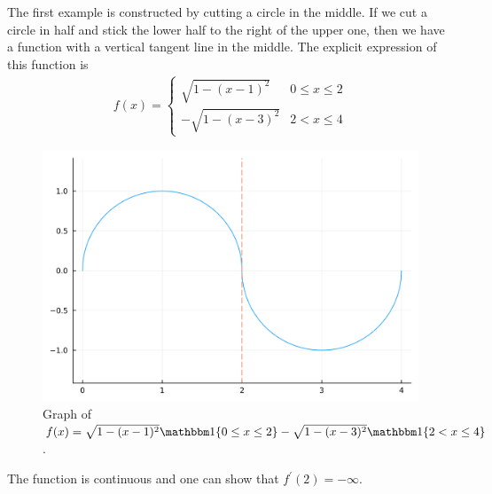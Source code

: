 \documentclass[thmcnt=section, 12pt]{my-elegantbook}
\begin{document}
\begin{example}
    The first example is constructed by cutting a circle in the middle. If we cut a circle in half and stick the lower half to the right of the upper one, then we have a function with a vertical tangent line in the middle. The explicit expression of this function is 
    \begin{align*}
        f(x) = \begin{cases}
            \sqrt{1 - (x-1)^2} &0 \leq x \leq 2 \\ 
            - \sqrt{1 - (x-3)^2} &2 < x \leq 4
        \end{cases}
    \end{align*}

    \begin{figure}[ht]
        \centering
        \includegraphics[scale=0.2]{figures/graph-002.png}
        \caption{Graph of $f(x) = \sqrt{1-(x-1)^2}\ind\{0 \leq x \leq 2\} - \sqrt{1-(x-3)^2}\ind\{2 < x \leq 4\}$.}
    \end{figure}

    \noindent The function is continuous and one can show that $f^\prime(2) = -\infty$.
    \label{eg:1}
\end{example}
\end{document}
